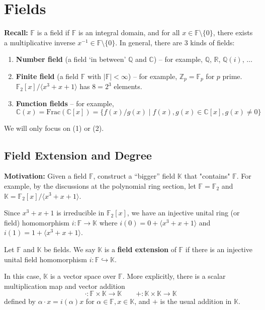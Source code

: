 \chapter{Fields}

\textbf{Recall:} $\mathbb{F}$ is a field if $\mathbb{F}$ is an integral domain, and for all $x \in \mathbb{F} \setminus \{0\}$, there exists a multiplicative inverse $x^{-1} \in \mathbb{F} \setminus \{0\}$. In general, there are 3 kinds of fields:
\begin{enumerate}
    \item \textbf{Number field} (a field `in between' $\mathbb{Q}$ and $\mathbb{C}$) -- for example, $\mathbb{Q}$, $\mathbb{R}$, $\mathbb{Q}(i)$, $\dots$
    \item \textbf{Finite field} (a field $\mathbb{F}$ with $|\mathbb{F}| < \infty$) -- for example, $\mathbb{Z}_p = \mathbb{F}_p$ for $p$ prime. $\mathbb{F}_2[x]/\langle x^3+x+1 \rangle$ has $8=2^3$ elements.
    \item \textbf{Function fields} -- for example, 
    $$\mathbb{C}(x) = \text{Frac}(\mathbb{C}[x]) = \{ f(x)/g(x) \mid f(x), g(x) \in \mathbb{C}[x], g(x) \neq 0 \}$$
\end{enumerate}
We will only focus on (1) or (2).

\section{Field Extension and Degree}

\textbf{Motivation:} Given a field $\mathbb{F}$, construct a ``bigger'' field $\mathbb{K}$ that "contains" $\mathbb{F}$. For example, by the discussions at the polynomial ring section, let $\mathbb{F} = \mathbb{F}_2$ and $\mathbb{K} = \mathbb{F}_2[x]/\langle x^3+x+1 \rangle$.

Since $x^3+x+1$ is irreducible in $\mathbb{F}_2[x]$, we have an injective unital ring (or field) homomorphism $i: \mathbb{F} \to \mathbb{K}$ where $i(0) = 0 + \langle x^3+x+1 \rangle$ and $i(1) = 1 + \langle x^3+x+1 \rangle$. 

\begin{definition}
Let $\mathbb{F}$ and $\mathbb{K}$ be fields. We say $\mathbb{K}$ is a \textbf{field extension} of $\mathbb{F}$ if there is an injective unital field homomorphism $i: \mathbb{F} \hookrightarrow  \mathbb{K}$.
\end{definition}

In this case, $\mathbb{K}$ is a vector space over $\mathbb{F}$. More explicitly, there is a scalar multiplication map and vector addition $$\cdot: \mathbb{F} \times \mathbb{K} \to \mathbb{K} 
\quad \quad +: \mathbb{K} \times \mathbb{K} \to \mathbb{K}$$
defined by $\alpha \cdot x = i(\alpha)x$ for $\alpha \in \mathbb{F}, x \in \mathbb{K}$, and $+$ is the usual addition in $\mathbb{K}$. 

